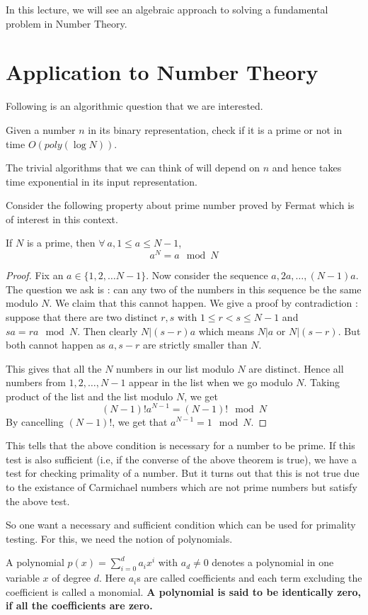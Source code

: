 In this lecture, we will see an algebraic approach to solving a fundamental
problem in Number Theory.
\section{Application to Number Theory}
Following is an algorithmic question that we are interested.
\begin{problem}
Given a number $n$ in its binary representation, check if it is a prime or not
in time $O(poly(\log N))$.
\end{problem}
\begin{note}
The trivial algorithms that we can think of will depend on $n$ and hence takes
time exponential in its input representation.
\end{note}

Consider the following property about prime number proved by Fermat which is
of interest in this context.
\begin{theorem} If $N$ is a prime, then $\forall~a, 1
	\le a \le N-1$, \[ a^N = a \mod N \]
\end{theorem}
\begin{proof}
	Fix an $a \in \{1,2,\ldots N-1\}$. Now consider the sequence $a, 2a,
	\ldots, (N-1)a$. The question we ask is : can any two of the numbers
	in this sequence be the same modulo $N$. We claim that this cannot
	happen. We give a proof by contradiction : suppose that there are two
	distinct $r,s$ with $1 \le r < s \le N-1$ and $sa = ra \mod N$. Then
	clearly $N | (s-r)a$ which means $N | a$ or $N | (s-r)$. But both
	cannot happen as $a, s-r$ are strictly smaller than $N$.

	This gives that all the $N$ numbers in our list modulo $N$ are
	distinct. Hence all numbers from $1,2,\ldots, N-1$ appear in the list
	when we go modulo $N$. Taking product of the list and the list modulo
	$N$, we get 
	\[ (N-1)! a^{N-1} = (N-1)! \mod N \]
	By cancelling $(N-1)!$, we get that $a^{N-1} = 1 \mod N$.
\end{proof}
This tells that the above condition is necessary for a number to be prime. If
this test is also sufficient (i.e, if the converse of the above theorem is
true), we have a test for checking primality of a number. But it turns out
that this is not true due to the existance of Carmichael numbers which are not
prime numbers but satisfy the above test.

So one want a necessary and sufficient condition which can be used for
primality testing. For this, we need the notion of polynomials.
\begin{definition}
	A polynomial $p(x) = \sum_{i=0}^d a_ix^i$ with $a_d \ne 0$ denotes a
	polynomial in one variable $x$ of degree $d$. Here $a_i$s are called
	coefficients and each term excluding the coefficient is called a
	monomial. \textbf{A polynomial is said to be identically zero, if all
	the coefficients are zero.}
\end{definition}

